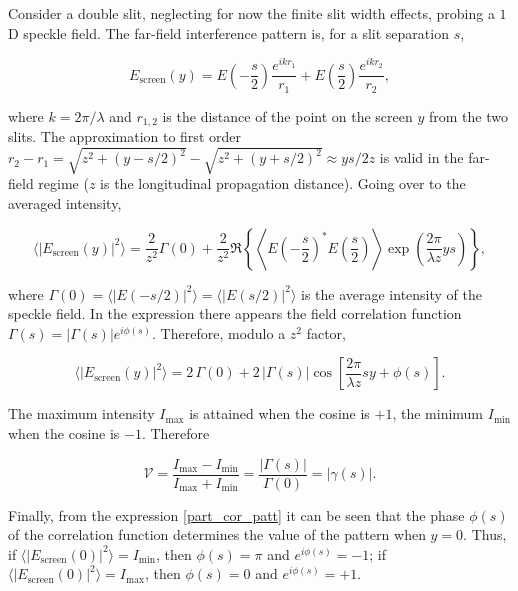Consider a double slit, neglecting for now the finite slit width effects, probing a $1$D speckle field. The far-field interference pattern is, for a slit 
separation $s$,

\begin{equation} \label{int_field}
    E_{\text{screen}}(y) = E\left(-\frac s2\right)\frac{e^{ikr_1}}{r_1} + E\left(\frac s2\right)\frac{e^{ikr_2}}{r_2},
\end{equation}

where $k = 2\pi/\lambda$ and $r_{1, 2}$ is the distance of the point on the screen $y$ from the two slits. The approximation to first order
$r_2 - r_1 = \sqrt{z^2 + (y - s/2)^2} - \sqrt{z^2 + (y + s/2)^2} \approx ys/2z$ is valid in the far-field regime ($z$ is the longitudinal propagation distance). 
Going over to the averaged intensity, 

\begin{equation}
    \langle |E_{\text{screen}}(y)|^2 \rangle = \frac 2{z^2}\Gamma(0) + \frac 2{z^2} \Re \left\{ \left\langle E\left(-\frac s2\right)^*E\left(\frac s2\right) \right\rangle  \exp\left( \frac{2\pi}{\lambda z} ys \right) \right\},
\end{equation}

where $\Gamma(0) = \langle |E(-s/2)|^2 \rangle =  \langle |E(s/2)|^2 \rangle$ is the average intensity of the speckle field. In the expression there appears the field correlation 
function $\Gamma(s) = |\Gamma(s)|e^{i\phi(s)}$. Therefore, modulo a $z^2$ factor,

\begin{equation} \label{part_cor_patt}
    \langle |E_{\text{screen}}(y)|^2 \rangle = 2 \, \Gamma(0) + 2 \, |\Gamma(s)| \cos\left[ \frac{2\pi}{\lambda z} sy + \phi(s) \right].
\end{equation}

The maximum intensity $I_{\text{max}}$ is attained when the cosine is $+1$, the minimum $I_{\text{min}}$ when the cosine is $-1$. Therefore 

\begin{equation}\label{vis_formula}
    \mathcal V = \frac{I_{\text{max}} - I_{\text{min}}}{I_{\text{max}} + I_{\text{min}}} = \frac{|\Gamma(s)|}{\Gamma(0)} = |\gamma(s)|.
\end{equation}

Finally, from the expression \eqref{part_cor_patt} it can be seen that the phase $\phi(s)$ of the correlation function determines the value of the pattern when 
$y = 0$. Thus, if $\langle |E_{\text{screen}}(0)|^2 \rangle = I_{\text{min}}$, then $\phi(s) = \pi$ and $e^{i\phi(s)} = -1$; if 
$\langle |E_{\text{screen}}(0)|^2 \rangle = I_{\text{max}}$, then $\phi(s) = 0$ and $e^{i\phi(s)} = +1$.

